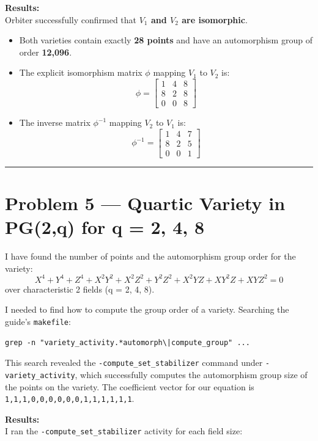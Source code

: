 \documentclass[12pt,a4paper]{article}
\begin{document}
\textbf{Results:}\\
Orbiter successfully confirmed that \textbf{$V_1$ and $V_2$ are isomorphic}.
\begin{itemize}
    \item Both varieties contain exactly \textbf{28 points} and have an automorphism group of order \textbf{12,096}.
    \item The explicit isomorphism matrix $\phi$ mapping $V_1$ to $V_2$ is:
    \[
    \phi = \begin{bmatrix} 1 & 4 & 8 \\ 8 & 2 & 8 \\ 0 & 0 & 8 \end{bmatrix}
    \]
    \item The inverse matrix $\phi^{-1}$ mapping $V_2$ to $V_1$ is:
    \[
    \phi^{-1} = \begin{bmatrix} 1 & 4 & 7 \\ 8 & 2 & 5 \\ 0 & 0 & 1 \end{bmatrix}
    \]
\end{itemize}

\vspace{0.5cm}
\hrule
\vspace{0.5cm}

\section*{Problem 5 --- Quartic Variety in PG(2,q) for q = 2, 4, 8}

I have found the number of points and the automorphism group order for the variety:
\[ X^4 + Y^4 + Z^4 + X^2Y^2 + X^2Z^2 + Y^2Z^2 + X^2YZ + XY^2Z + XYZ^2 = 0 \]
over characteristic 2 fields (q = 2, 4, 8).

I needed to find how to compute the group order of a variety. Searching the guide's \texttt{makefile}:
\begin{verbatim}
grep -n "variety_activity.*automorph\|compute_group" ...
\end{verbatim}
This search revealed the \texttt{-compute\_set\_stabilizer} command under \texttt{-variety\_activity}, which successfully computes the automorphism group size of the points on the variety. The coefficient vector for our equation is \texttt{1,1,1,0,0,0,0,0,0,1,1,1,1,1,1}.

\vspace{0.3cm}\noindent\textbf{Results:}\\
I ran the \texttt{-compute\_set\_stabilizer} activity for each field size:
\end{document}
